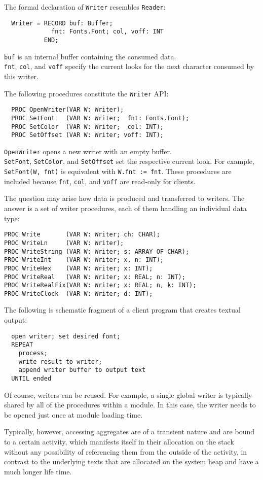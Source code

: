 The formal declaration of \verb|Writer| resembles \verb|Reader|:
\begin{verbatim}
  Writer = RECORD buf: Buffer;
             fnt: Fonts.Font; col, voff: INT
           END;
\end{verbatim}

\verb|buf| is an internal buffer containing the consumed data. \\
\verb|fnt|, \verb|col|, and \verb|voff| specify the current looks
for the next character consumed by this writer.

The following procedures constitute the \verb|Writer| API:
\begin{verbatim}
  PROC OpenWriter(VAR W: Writer);
  PROC SetFont   (VAR W: Writer;  fnt: Fonts.Font);
  PROC SetColor  (VAR W: Writer;  col: INT);
  PROC SetOffset (VAR W: Writer; voff: INT);
\end{verbatim}
\verb|OpenWriter| opens a new writer with an empty buffer. \\
\verb|SetFont|, \verb|SetColor|, and \verb|SetOffset| set the respective current look.
For example, \verb|SetFont(W, fnt)| is equivalent with \verb|W.fnt := fnt|.
These procedures are included because
\verb|fnt|, \verb|col|, and \verb|voff| are read-only for clients.

The question may arise how data is produced and transferred to writers.
The answer is a set of writer procedures, each of them handling an individual data type:
\begin{verbatim}
PROC Write       (VAR W: Writer; ch: CHAR);
PROC WriteLn     (VAR W: Writer);
PROC WriteString (VAR W: Writer; s: ARRAY OF CHAR);
PROC WriteInt    (VAR W: Writer; x, n: INT);
PROC WriteHex    (VAR W: Writer; x: INT);
PROC WriteReal   (VAR W: Writer; x: REAL; n: INT);
PROC WriteRealFix(VAR W: Writer; x: REAL; n, k: INT);
PROC WriteClock  (VAR W: Writer; d: INT);
\end{verbatim}

The following is schematic fragment of a client program that creates textual output:
\begin{verbatim}
  open writer; set desired font;
  REPEAT
    process;
    write result to writer;
    append writer buffer to output text
  UNTIL ended
\end{verbatim}
Of course, writers can be reused.
For example, a single global writer is typically shared by all of the procedures within a module.
In this case, the writer needs to be opened just once at module loading time.

Typically, however, accessing aggregates are of a transient nature and are bound to a certain activity,
which manifests itself in their allocation on the stack
without any possibility of referencing them from the outside of the activity,
in contrast to the underlying texts that are allocated on the system heap and have a much longer life time.

